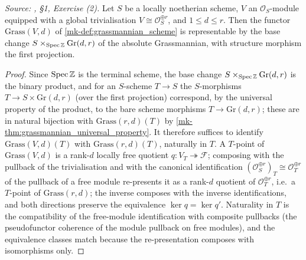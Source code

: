 \begin{lemma}\label{mk-lem:grassmannian_representable_free}
  \leanok

  \textit{Source: \cite{nitsure-hilbert-quot}, \S 1, Exercise (2).}
  Let \(S\) be a locally noetherian scheme, \(V\) an \(\mathcal{O}_S\)-module
  equipped with a global trivialisation \(V \cong \mathcal{O}_S^{\oplus r}\),
  and \(1 \le d \le r\). Then the functor \(\mathrm{Grass}(V, d)\) of
  \ref{mk-def:grassmannian_scheme} is representable by the base change
  \(S \times_{\operatorname{Spec} \mathbb{Z}} \mathrm{Gr}(d,r)\) of the absolute
  Grassmannian, with structure morphism the first projection.
\end{lemma}

\begin{proof}
  \leanok{}
  Since \(\operatorname{Spec} \mathbb{Z}\) is the terminal scheme, the base change
  \(S \times_{\operatorname{Spec}\mathbb{Z}} \mathrm{Gr}(d,r)\) is the binary product, and
  for an \(S\)-scheme \(T \to S\) the \(S\)-morphisms
  \(T \to S \times \mathrm{Gr}(d,r)\) (over the first projection) correspond,
  by the universal property of the product, to the bare scheme morphisms
  \(T \to \mathrm{Gr}(d,r)\); these are in natural bijection with
  \(\mathrm{Grass}(r,d)(T)\) by \ref{mk-thm:grassmannian_universal_property}.
  It therefore suffices to identify \(\mathrm{Grass}(V,d)(T)\) with
  \(\mathrm{Grass}(r,d)(T)\), naturally in \(T\).  A \(T\)-point of
  \(\mathrm{Grass}(V,d)\) is a rank-\(d\) locally free quotient
  \(q : V_T \twoheadrightarrow \mathcal{F}\); composing with the pullback of
  the trivialisation and with the canonical identification
  \((\mathcal{O}_S^{\oplus r})_T \cong \mathcal{O}_T^{\oplus r}\) of the
  pullback of a free module re-presents it as a rank-\(d\) quotient of
  \(\mathcal{O}_T^{\oplus r}\), i.e.\ a \(T\)-point of
  \(\mathrm{Grass}(r,d)\); the inverse composes with the inverse
  identifications, and both directions preserve the equivalence
  \(\ker q = \ker q'\).  Naturality in \(T\) is the compatibility of the
  free-module identification with composite pullbacks (the pseudofunctor
  coherence of the module pullback on free modules), and the equivalence
  classes match because the re-presentation composes with isomorphisms only.
\end{proof}

